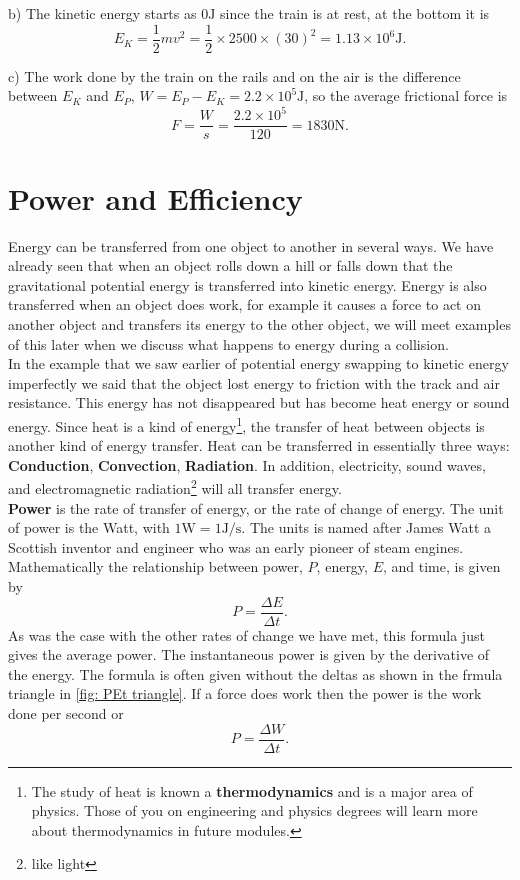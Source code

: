 \documentclass[a4paper,12pt]{book}
\begin{document}
b) The kinetic energy starts as $0\text{J}$ since the train is at rest, at the bottom it is
\begin{equation*}
E_{K}=\frac{1}{2}mv^{2}=\frac{1}{2}\times 2500\times (30)^{2}=1.13\times 10^{6}\text{J}.
\end{equation*}

c) The work done by the train on the rails and on the air is the difference between $E_{K}$ and $E_{P}$, $W=E_{P}-E_{K}=2.2\times 10^{5}\text{J}$, so the average frictional force is
\begin{equation*}
F=\frac{W}{s}=\frac{2.2\times 10^{5}}{120}=1830\text{N}.
\end{equation*}

\section{Power and Efficiency}
Energy can be transferred from one object to another in several ways. We have already seen that when an object rolls down a hill or falls down that the gravitational potential energy is transferred into kinetic energy. Energy is also transferred when an object does work, for example it causes a force to act on another object and transfers its energy to the other object, we will meet examples of this later when we discuss what happens to energy during a collision.\\

In the example that we saw earlier of potential energy swapping to kinetic energy imperfectly we said that the object lost energy to friction with the track and air resistance. This energy has not disappeared but has become heat energy or sound energy.  Since heat is a kind of energy\footnote{The study of heat is known a \textbf{thermodynamics} and is a major area of physics. Those of you on engineering and physics degrees will learn more about thermodynamics in future modules.}, the transfer of heat between objects is another kind of energy transfer. Heat can be transferred in essentially three ways: \textbf{Conduction}, \textbf{Convection}, \textbf{Radiation}. In addition, electricity, sound waves, and electromagnetic radiation\footnote{like light} will all transfer energy.\\

\textbf{Power} is the rate of transfer of energy, or the rate of change of energy. The unit of power is the Watt, with $1\text{W}=1 \text{J}/\text{s}$. The units is named after James Watt a Scottish inventor and engineer who was an early pioneer of steam engines. Mathematically the relationship between power, $P$, energy, $E$, and time, is given by
\begin{equation}
P=\frac{\Delta E}{\Delta t}.
\label{eq: PET equation}
\end{equation}
As was the case with the other rates of change we have met, this formula just gives the average power. The instantaneous power is given by the derivative of the energy. The formula is often given without the deltas as shown in the frmula triangle in \cref{fig: PEt triangle}. If a force does work then the power is the work done per second or 
\begin{equation*}
P=\frac{\Delta W}{\Delta t}.
\end{equation*}
\end{document}
